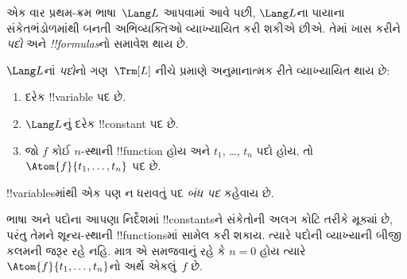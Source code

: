 \documentclass[../../../include/open-logic-section]{subfiles}
\begin{document}


એક વાર પ્રથમ-ક્રમ ભાષા~$\Lang L$ આપવામાં આવે પછી, $\Lang L$ના પાયાના
સંકેતભંડોળમાંથી બનતી અભિવ્યક્તિઓ વ્યાખ્યાયિત કરી શકીએ છીએ. તેમાં ખાસ
કરીને \emph{પદો} અને \emph{!!{formula}s}નો સમાવેશ થાય છે.

\begin{defn}[પદો]
$\Lang L$નાં \emph{પદો}નો ગણ~$\Trm[L]$ નીચે પ્રમાણે અનુમાનાત્મક રીતે
વ્યાખ્યાયિત થાય છે:
\begin{enumerate}
\item દરેક !!{variable} પદ છે.
\item $\Lang L$નું દરેક !!{constant} પદ છે.
\item જો $f$ કોઈ $n$-સ્થાની !!{function} હોય અને $t_1$, \dots, $t_n$
  પદો હોય, તો $\Atom{f}{t_1, \ldots, t_n}$ પદ છે.
\end{enumerate}
!!{variable}sમાંથી એક પણ ન ધરાવતું પદ \emph{બંધ પદ} કહેવાય છે.
\end{defn}

\begin{explain}
ભાષા અને પદોના આપણા નિર્દેશમાં !!{constant}sને સંકેતોની અલગ કોટિ
તરીકે મૂક્યાં છે, પરંતુ તેમને શૂન્ય-સ્થાની !!{function}sમાં સામેલ કરી
શકાય. ત્યારે પદોની વ્યાખ્યાની બીજી કલમની જરૂર રહે નહિ. માત્ર એ
સમજવાનું રહે કે $n=0$ હોય ત્યારે $\Atom{f}{t_1, \ldots, t_n}$નો અર્થ
એકલું~$f$ છે.
\end{explain}
\end{document}
